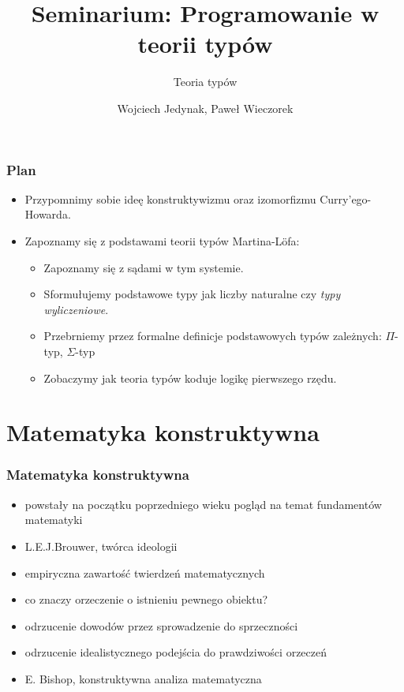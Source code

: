 \documentclass{beamer}
\title{Seminarium: Programowanie w teorii typów}
\subtitle{Teoria typów}
\author{Wojciech Jedynak, Paweł Wieczorek}
\institute{Instytut Informatyki Uniwersytetu Wrocławskiego}
\begin{document}

\maketitle




\begin{frame}
\frametitle{Plan}

\begin{itemize}
 \item Przypomnimy sobie ideę konstruktywizmu oraz izomorfizmu Curry'ego-Howarda.
 \item Zapoznamy się z podstawami teorii typów Martina-L\"{o}fa:
 \begin{itemize}
 \item Zapoznamy się z sądami w tym systemie.
 \item Sformułujemy podstawowe typy jak liczby naturalne czy \emph{typy wyliczeniowe}.
 \item Przebrniemy przez formalne definicje podstawowych typów zależnych: $\Pi$-typ, $\Sigma$-typ
 \item Zobaczymy jak teoria typów koduje logikę pierwszego rzędu.
 \end{itemize}
\end{itemize}

\end{frame}

\section{Matematyka konstruktywna}

\begin{frame}
\frametitle{Matematyka konstruktywna}

\begin{itemize}
 \item powstały na początku poprzedniego wieku pogląd na temat fundamentów matematyki
 \item L.E.J.Brouwer, twórca ideologii
 \item empiryczna zawartość twierdzeń matematycznych
 \item co znaczy orzeczenie o istnieniu pewnego obiektu?
 \item odrzucenie dowodów przez sprowadzenie do sprzeczności
 \item odrzucenie idealistycznego podejścia do prawdziwości orzeczeń
 \item E. Bishop, konstruktywna analiza matematyczna
\end{itemize}


\end{frame}
\end{document}
